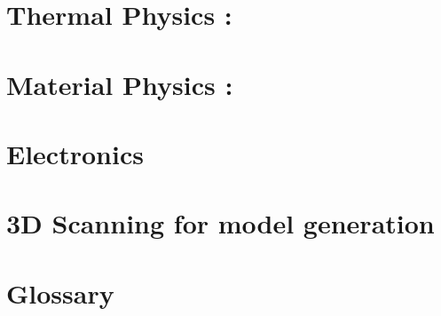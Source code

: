 \documentclass[nols,a4paper,twoside,symmetric,justified,marginals=raggedouter]{tufte-book} %
\begin{document}

\chapter{Thermal Physics : }
\label{ch:thermal_fdm}



\chapter{Material Physics : }
\label{ch:materials_fdm}



\chapter{Electronics}
\label{ch:hardware}


\chapter{3D Scanning for model generation}
\label{ch:model_generation}
% 






\backmatter

\chapter{Glossary}
\end{document}
